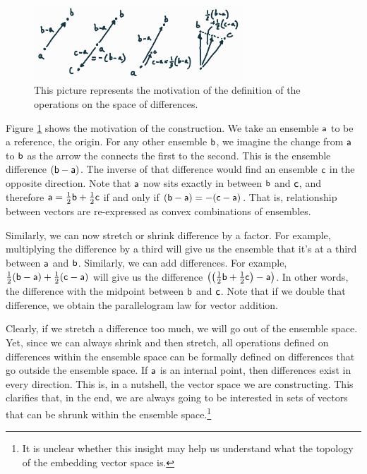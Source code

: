 \begin{figure}[H]
	\centering
	\includegraphics[width=0.7\textwidth]{tempimages/EnsembleDifferences.jpg}
	\caption{This picture represents the motivation of the definition of the operations on the space of differences.}\label{pm_es_vectorJustification}
\end{figure}

Figure \ref{pm_es_vectorJustification} shows the motivation of the construction. We take an ensemble $\ens[a]$ to be a reference, the origin. For any other ensemble $\ens[b]$, we imagine the change from $\ens[a]$ to $\ens[b]$ as the arrow the connects the first to the second. This is the ensemble difference $(\ens[b] - \ens[a])$. The inverse of that difference would find an ensemble $\ens[c]$ in the opposite direction. Note that $\ens[a]$ now sits exactly in between $\ens[b]$ and $\ens[c]$, and therefore $\ens[a] = \frac{1}{2}\ens[b] + \frac{1}{2}\ens[c]$ if and only if $(\ens[b] - \ens[a]) = - (\ens[c]- \ens[a])$. That is, relationship between vectors are re-expressed as convex combinations of ensembles.

Similarly, we can now stretch or shrink difference by a factor. For example, multiplying the difference by a third will give us the ensemble that it's at a third between $\ens[a]$ and $\ens[b]$. Similarly, we can add differences. For example, $\frac{1}{2}(\ens[b] - \ens[a]) + \frac{1}{2}(\ens[c] - \ens[a])$ will give us the difference $\left(\left(\frac{1}{2}\ens[b] + \frac{1}{2}\ens[c]\right) - \ens[a]\right)$. In other words, the difference with the midpoint between $\ens[b]$ and $\ens[c]$. Note that if we double that difference, we obtain the parallelogram law for vector addition.

Clearly, if we stretch a difference too much, we will go out of the ensemble space. Yet, since we can always shrink and then stretch,  all operations defined on differences within the ensemble space can be formally defined on differences that go outside the ensemble space. If $\ens[a]$ is an internal point, then differences exist in every direction. This is, in a nutshell, the vector space we are constructing. This clarifies that, in the end, we are always going to be interested in sets of vectors that can be shrunk within the ensemble space.\footnote{It is unclear whether this insight may help us understand what the topology of the embedding vector space is.}

